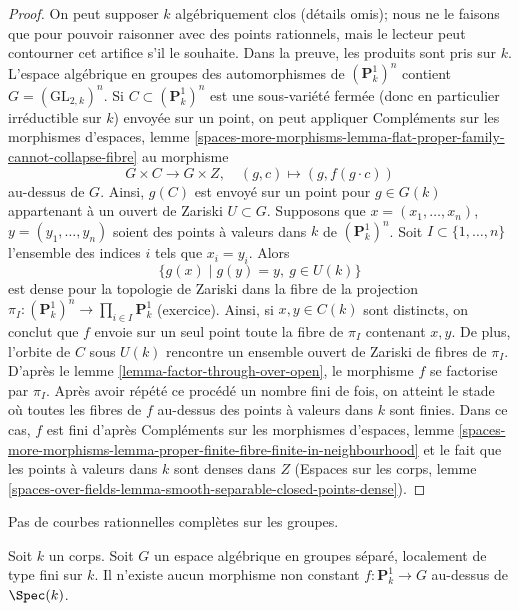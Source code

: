 \begin{proof}
On peut supposer $k$ algébriquement clos (détails omis); nous ne le faisons
que pour pouvoir raisonner avec des points rationnels, mais le lecteur peut
contourner cet artifice s'il le souhaite. Dans la preuve, les produits sont pris sur $k$.
L'espace algébrique en groupes des automorphismes de $(\mathbf{P}^1_k)^n$ contient
$G = (\text{GL}_{2, k})^n$. Si $C \subset (\mathbf{P}^1_k)^n$ est une
sous-variété fermée (donc en particulier irréductible sur $k$) envoyée
sur un point, on peut appliquer
Compléments sur les morphismes d'espaces,
lemme \ref{spaces-more-morphisms-lemma-flat-proper-family-cannot-collapse-fibre}
au morphisme
$$
G \times C \to G \times Z,\quad (g, c) \mapsto (g, f(g \cdot c))
$$
au-dessus de $G$. Ainsi, $g(C)$ est envoyé sur un point pour $g \in G(k)$
appartenant à un ouvert de Zariski $U \subset G$. Supposons que
$x = (x_1, \ldots, x_n)$, $y = (y_1, \ldots, y_n)$
soient des points à valeurs dans $k$ de $(\mathbf{P}^1_k)^n$. Soit
$I \subset \{1, \ldots, n\}$ l'ensemble des indices $i$
tels que $x_i = y_i$. Alors
$$
\{g(x) \mid g(y) = y,\ g \in U(k)\}
$$
est dense pour la topologie de Zariski dans la fibre de la projection
$\pi_I : (\mathbf{P}^1_k)^n \to \prod_{i \in I} \mathbf{P}^1_k$
(exercice). Ainsi, si $x, y \in C(k)$ sont distincts, on conclut
que $f$ envoie sur un seul point toute la fibre de $\pi_I$ contenant $x, y$.
De plus, l'orbite de $C$ sous $U(k)$ rencontre un ensemble ouvert de Zariski
de fibres de $\pi_I$. D'après le lemme \ref{lemma-factor-through-over-open},
le morphisme $f$ se factorise par $\pi_I$.
Après avoir répété ce procédé un nombre fini de fois, on atteint
le stade où toutes les fibres de $f$ au-dessus des points à valeurs dans $k$ sont finies.
Dans ce cas, $f$ est fini d'après
Compléments sur les morphismes d'espaces, lemme
\ref{spaces-more-morphisms-lemma-proper-finite-fibre-finite-in-neighbourhood}
et le fait que les points à valeurs dans $k$ sont denses dans $Z$
(Espaces sur les corps, lemme
\ref{spaces-over-fields-lemma-smooth-separable-closed-points-dense}).
\end{proof}

\begin{lemma}
\label{lemma-no-nonconstant-morphism-from-P1-to-group}
\begin{slogan}
Pas de courbes rationnelles complètes sur les groupes.
\end{slogan}
Soit $k$ un corps. Soit $G$ un espace algébrique en groupes séparé,
localement de type fini sur $k$. Il n'existe aucun
morphisme non constant $f : \mathbf{P}^1_k \to G$ au-dessus de $\Spec(k)$.
\end{lemma}

